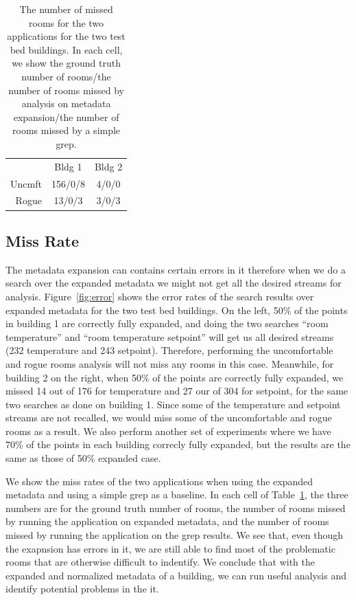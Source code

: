 \begin{table}[h!]
 \begin{center}
\begin{tabular}{rcc}
\multicolumn{1}{l}{} & Bldg 1                 & Bldg 2                  \\ \cline{2-3} 
Uncmft               & \multicolumn{1}{|c}{156/0/8} & \multicolumn{1}{|c|}{4/0/0} \\ \cline{2-3} 
Rogue                & \multicolumn{1}{|c}{13/0/3} & \multicolumn{1}{|c|}{3/0/3} \\ \cline{2-3} 
\end{tabular}
 \end{center}
 \caption{The number of missed rooms for the two applications for the two test bed buildings. In each cell, we show the ground truth number of rooms/the number of rooms missed by analysis on metadata expansion/the number of rooms missed by a simple grep.}
 \label{tab:error}
\end{table}

\subsection{Miss Rate}
The metadata expansion can contains certain errors in it therefore when we do a search over the expanded metadata we might not get all the desired streams for analysis. Figure~\ref{fig:error} shows the error rates of the search results over expanded metadata for the two test bed buildings. On the left, 50\% of the points in building 1 are correctly fully expanded, and doing the two searches ``room temperature'' and ``room temperature setpoint'' will get us all desired streams (232 temperature and 243 setpoint). Therefore, performing the uncomfortable and rogue rooms analysis will not miss any rooms in this case. Meanwhile, for building 2 on the right, when 50\% of the points are correctly fully expanded, we missed 14 out of 176 for temperature and 27 our of 304 for setpoint, for the same two searches as done on building 1. Since some of the temperature and setpoint streams are not recalled, we would miss some of the uncomfortable and rogue rooms as a result.
We also perform another set of experiments where we have 70\% of the points in each building correcly fully expanded, but the results are the same as those of 50\% expanded case.

We show the miss rates of the two applications when using the expanded metadata and using a simple grep as a baseline. In each cell of Table~\ref{tab:error}, the three numbers are for the ground truth number of rooms, the number of rooms missed by running the application on expanded metadata, and the number of rooms missed by running the application on the grep results. We see that, even though the exapnsion has errors in it, we are still able to find most of the problematic rooms that are otherwise difficult to indentify. We conclude that with the expanded and normalized metadata of a building, we can run useful analysis and identify potential problems in the it.
